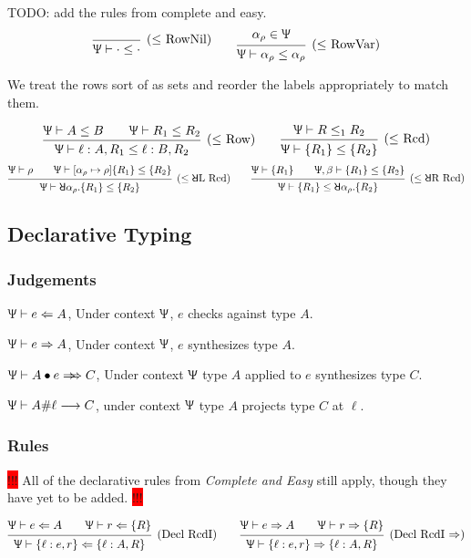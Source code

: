 \documentclass{article}
\newcommand{\consider}[1]{\colorbox{red}{!!!} #1 \colorbox{red}{!!!}}
\newcommand{\declCtx}{\Uppsi}
\newcommand{\rcd}[1]{\{#1\}}
\newcommand{\rowall}{\rotatebox[origin=c]{180}{\(\mathsf{R}\)}}
\newcommand{\rowvar}{\alpha_\rho}
\newcommand{\synthesizes}{\Rightarrow \!\!\! \Rightarrow}
\newcommand{\app}{\bullet}
\newcommand{\spc}{\qquad}
\newcommand{\wf}[2]{#1 \vdash #2}
\newcommand{\subtype}{\le}
\newcommand{\subtypes}[3]{#1 \vdash #2 \le #3}
\newcommand{\declSynth}[3]{#1 \vdash #2 \Rightarrow #3}
\newcommand{\declCheck}[3]{#1 \vdash #2 \Leftarrow #3}
\newcommand{\declApSynth}[4]{#1 \vdash #2 \app #3 \synthesizes #4}
\newcommand{\declLookup}[4]{#1 \vdash #2 \# #3 \longrightarrow #4}
\newcommand{\deduct}[3][]
{
  \begin{prooftree}
    \hypo{#2}
    \infer1[\text{#1}]{#3}
  \end{prooftree}
}
\begin{document}
TODO: add the rules from complete and easy.
\[
  \deduct[(\(\subtype\) RowNil)]
  {}
  {\subtypes{\declCtx}{\cdot}{\cdot}}
  \spc
  \deduct[(\(\subtype\) RowVar)]
  {\rowvar \in \declCtx}
  {\subtypes{\declCtx}{\rowvar}{\rowvar}}
\]

We treat the rows sort of as sets and reorder the labels appropriately to match
them.

\[
  \deduct[(\(\subtype\) Row)]
  {\subtypes{\declCtx}{A}{B} \spc \subtypes{\declCtx}{R_1}{R_2}}
  {\subtypes \declCtx {\ell : A, R_1}{\ell : B, R_2}}
  \spc
  \deduct[(\(\subtype\) \text{Rcd})]
  {\subtypes \declCtx R_1 R_2}
  {\subtypes {\declCtx} {\rcd{R_1}} {\rcd{R_2}}}
\]
\[
  \deduct[(\(\subtype\rowall\)L Rcd)]
  {\wf \declCtx \rho \spc \subtypes \declCtx {[\rowvar \mapsto \rho]\rcd{R_1}} {\rcd{R_2}} }
  {\wf \declCtx \rowall \rowvar. \rcd{R_1} \le \rcd{R_2}}
  \spc
  \deduct[(\(\subtype\rowall\)R Rcd)]
  {\wf \declCtx {\rcd{R_1}} \spc \subtypes {\declCtx,\beta} {\rcd{R_1}} {\rcd{R_2}} }
  {\subtypes \declCtx {\rcd{R_1}} {\rowall \rowvar. \rcd{R_2}} }
\]

\subsection{Declarative Typing}

\subsubsection{Judgements}

\(\declCheck \declCtx e A\), Under context \(\declCtx\), \(e\) checks against
type \(A\).

\(\declSynth \declCtx e A\), Under context \(\declCtx\), \(e\) synthesizes type
\(A\).

\(\declApSynth \declCtx A e C\), Under context \(\declCtx\) type \(A\) applied
to \(e\) synthesizes type \(C\).

\(\declLookup \declCtx A \ell C\), under context \(\declCtx\) type \(A\)
projects type \(C\) at \(\ell\).

\subsubsection{Rules}

\consider{All of the declarative rules from \emph{Complete and Easy} still
  apply, though they have yet to be added.}

\[
  \deduct[(Decl RcdI)]
  {\declCheck \declCtx e A \spc \declCheck \declCtx r \rcd{R}}
  {\declCheck \declCtx {\rcd{\ell : e, r}} {\rcd{\ell : A, R}}}
  \spc
  \deduct[(Decl RcdI \(\Rightarrow\))]
  {\declSynth \declCtx e A \spc \declSynth \declCtx r \rcd{R}}
  {\declSynth \declCtx {\rcd{\ell : e, r}} {\rcd{\ell : A, R}}}
\]
\end{document}
